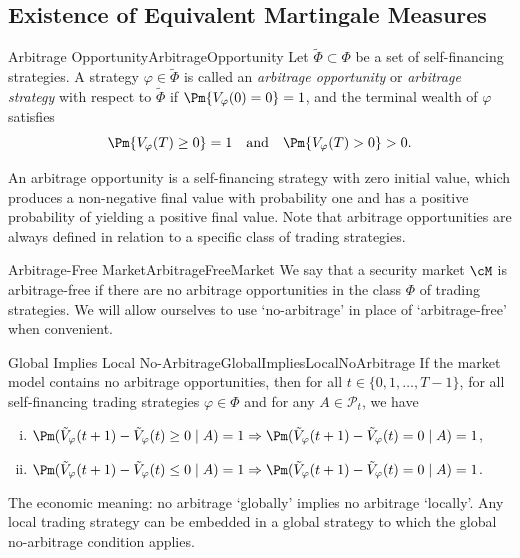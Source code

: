 \subsection{Existence of Equivalent Martingale Measures}

\begin{defn}{Arbitrage Opportunity}{ArbitrageOpportunity}
	Let \(\tilde{\Phi}\subset\Phi\) be a set of self-financing strategies. A strategy \(\varphi\in\tilde{\Phi}\) is called an \textit{arbitrage opportunity} or \textit{arbitrage strategy} with respect to \(\tilde{\Phi}\) if \(\Pm\{V_{\varphi}(0)=0\}=1\), and the terminal wealth of \(\varphi\) satisfies
	\[
		\Pm\{V_{\varphi}(T)\ge 0\}=1\quad\text{and}\quad\Pm\{V_{\varphi}(T)>0\}>0.
	\]
\end{defn}

An arbitrage opportunity is a self-financing strategy with zero initial value, which produces a non-negative final value with probability one and has a positive probability of yielding a positive final value. Note that arbitrage opportunities are always defined in relation to a specific class of trading strategies.

\begin{defn}{Arbitrage-Free Market}{ArbitrageFreeMarket}
	We say that a security market \(\cM\) is arbitrage-free if there are no arbitrage opportunities in the class \(\Phi\) of trading strategies. We will allow ourselves to use ‘no-arbitrage’ in place of ‘arbitrage-free’ when convenient.
\end{defn}

\begin{lem}{Global Implies Local No-Arbitrage}{GlobalImpliesLocalNoArbitrage}
	If the market model contains no arbitrage opportunities, then for all \(t\in\{0,1,\dots,T-1\}\), for all self-financing trading strategies \(\varphi\in\Phi\) and for any \(A\in\mathcal{P}_t\), we have
	\begin{enumerate}[(i)]
		\item \(\Pm(\tilde{V}_{\varphi}(t+1)-\tilde{V}_{\varphi}(t)\ge 0\mid A)=1\Rightarrow \Pm(\tilde{V}_{\varphi}(t+1)-\tilde{V}_{\varphi}(t)=0\mid A)=1\),
		\item \(\Pm(\tilde{V}_{\varphi}(t+1)-\tilde{V}_{\varphi}(t)\le 0\mid A)=1\Rightarrow \Pm(\tilde{V}_{\varphi}(t+1)-\tilde{V}_{\varphi}(t)=0\mid A)=1\).
	\end{enumerate}
\end{lem}

The economic meaning: no arbitrage ‘globally’ implies no arbitrage ‘locally’. Any local trading strategy can be embedded in a global strategy to which the global no-arbitrage condition applies.

